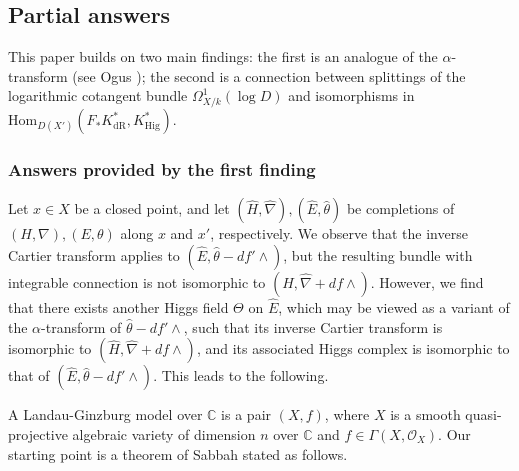 \documentclass[12pt, a4paper]{article}
\begin{document}
\subsection{Partial answers}
 This paper builds on two main findings: the first is an analogue of the $\alpha$-transform (see Ogus \cite{O24}); the second is a connection between splittings of the logarithmic cotangent bundle $\Omega^1_{X/k}(\log D)$ and isomorphisms in $\mathrm{Hom}_{D(X')}(F_*K^*_\mathrm{dR},K^*_\mathrm{Hig})$.

\subsubsection{Answers provided by the first finding}
 Let $x\in X$ be a closed point, and let $(\hat H,\hat \nabla),(\hat E,\hat\theta)$ be completions of $(H,\nabla),(E,\theta)$ along $x$ and $x'$, respectively. We observe that the inverse Cartier transform applies to $(\hat E, \hat \theta - df' \wedge)$, but the resulting bundle with integrable connection is not isomorphic to $(\hat H, \hat \nabla + df \wedge)$. However, we find that there exists another Higgs field $\Theta$ on $\hat E$, which may be viewed as a variant of the $\alpha$-transform of $\hat \theta - df' \wedge$, such that its inverse Cartier transform is isomorphic to $(\hat H, \hat \nabla + df \wedge)$, and its associated Higgs complex is isomorphic to that of $(\hat E, \hat \theta - df' \wedge)$. This leads to the following.











\iffalse
A Landau-Ginzburg model over $\mathbb C$ is a pair $(X,f)$, where $X$ is a smooth quasi-projective algebraic variety of dimension $n$ over $\mathbb C$ and $f\in\Gamma(X,\mathcal O_X)$. Our starting point is a theorem of Sabbah stated as follows.
 
\end{document}
